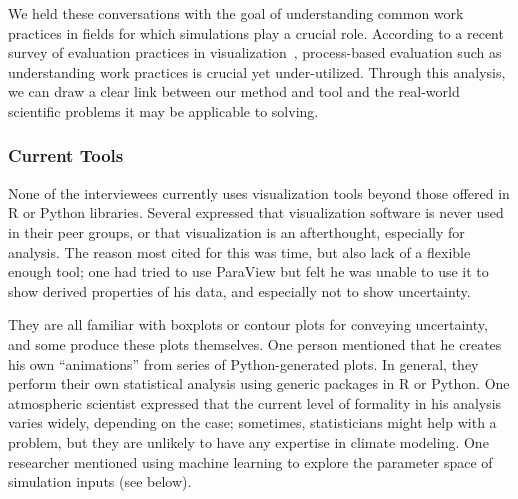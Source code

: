 We held these conversations with the goal of understanding common work practices in fields for which simulations play a crucial role. According to a recent survey of evaluation practices in visualization~\cite{6634108}, process-based evaluation such as understanding work practices is crucial yet under-utilized. Through this analysis, we can draw a clear link between our method and tool and the real-world scientific problems it may be applicable to solving.

\subsubsection{Current Tools}
None of the interviewees currently uses visualization tools beyond those offered in R or Python libraries. Several expressed that visualization software is never used in their peer groups, or that visualization is an afterthought, especially for analysis. The reason most cited for this was time, but also lack of a flexible enough tool; one had tried to use ParaView but felt he was unable to use it to show derived properties of his data, and especially not to show uncertainty.

They are all familiar with boxplots or contour plots for conveying uncertainty, and some produce these plots themselves. One person mentioned that he creates his own ``animations'' from series of Python-generated plots. In general, they perform their own statistical analysis using generic packages in R or Python. One atmospheric scientist expressed that the current level of formality in his analysis varies widely, depending on the case; sometimes, statisticians might help with a problem, but they are unlikely to have any expertise in climate modeling. One researcher mentioned using machine learning to explore the parameter space of simulation inputs (see below).

